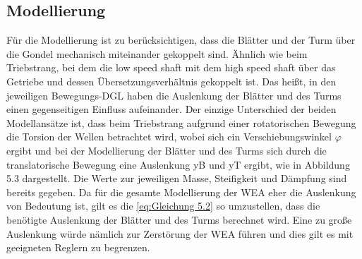 \subsection{Modellierung}

Für die Modellierung ist zu berücksichtigen, dass die Blätter und der Turm über die Gondel mechanisch miteinander gekoppelt sind. Ähnlich wie beim Triebstrang, bei dem die low speed shaft mit dem high speed shaft über das Getriebe und dessen Übersetzungsverhältnis gekoppelt ist. Das heißt, in den jeweiligen Bewegungs-DGL haben die Auslenkung der Blätter und des Turms einen gegenseitigen Einfluss aufeinander. Der einzige Unterschied der beiden Modellansätze ist, dass beim Triebstrang aufgrund einer rotatorischen Bewegung die Torsion der Wellen betrachtet wird, wobei sich ein Verschiebungswinkel $\varphi$ ergibt und bei der Modellierung der Blätter und des Turms sich durch die translatorische Bewegung eine Auslenkung \acs{yB} und \acs{yT} ergibt, wie in Abbildung 5.3 dargestellt. Die Werte zur jeweiligen Masse, Steifigkeit und Dämpfung sind bereits gegeben. Da für die gesamte Modellierung der WEA eher die Auslenkung von Bedeutung ist, gilt es die \autoref{eq:Gleichung 5.2} so umzustellen, dass die benötigte Auslenkung der Blätter und des Turms berechnet wird. Eine zu große Auslenkung würde nämlich zur Zerstörung der WEA führen und dies gilt es mit geeigneten Reglern zu begrenzen. 

